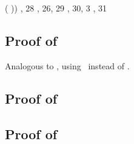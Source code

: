 \begin{derivation}
{{{{                            {(
                                   {})}})}}
            {\tarr{\typ}{\bool}}}
     {\Reabsalpha, 28}
     {\Reapp, 26, 29}
     {\Reabs, 30, 3}
      {\Reabsalpha, 31}
\end{derivation}



\subsection*{Proof of }

Analogous to , using \ReexIop\ instead of \Refaop.



\subsection*{Proof of }

\begin{derivation}
\step{\istyO{\trecO}}{\hyp}
\step{\hastyO{\expr}{\trecO}}{\hyp}
\end{derivation}



\subsection*{Proof of }

